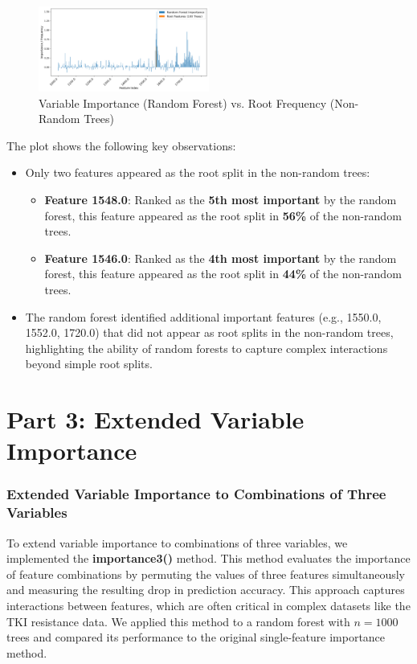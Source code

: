 \documentclass[fleqn,moreauthors,10pt]{ds_report}
\begin{document}
\begin{figure}[h!]
    \centering
    \includegraphics[width=0.5\textwidth]{fig/variable_importance}
    \caption{Variable Importance (Random Forest) vs. Root Frequency (Non-Random Trees)}
    \label{fig:variable_importance}
\end{figure}
The plot shows the following key observations:
\begin{itemize}
    \item Only two features appeared as the root split in the non-random trees:
        \begin{itemize}
            \item \textbf{Feature 1548.0}: Ranked as the \textbf{5th most important} by the random forest, this feature appeared as the root split in \textbf{56\%} of the non-random trees.
            \item \textbf{Feature 1546.0}: Ranked as the \textbf{4th most important} by the random forest, this feature appeared as the root split in \textbf{44\%} of the non-random trees.
        \end{itemize}
    \item The random forest identified additional important features (e.g., 1550.0, 1552.0, 1720.0) that did not appear as root splits in the non-random trees, highlighting the ability of random forests to capture complex interactions beyond simple root splits.
\end{itemize}



\section*{Part 3: Extended Variable Importance}


\subsubsection*{Extended Variable Importance to Combinations of Three Variables}
To extend variable importance to combinations of three variables, we implemented the \textbf{importance3()} method. This method evaluates the importance of feature combinations by permuting the values of three features simultaneously and measuring the resulting drop in prediction accuracy.
This approach captures interactions between features, which are often critical in complex datasets like the TKI resistance data. We applied this method to a random forest with \( n = 1000 \) trees and compared its performance to the original single-feature importance method.
\end{document}

